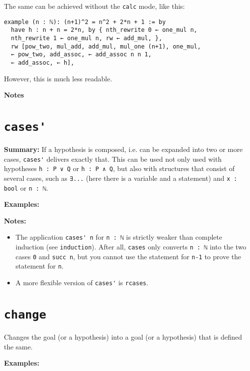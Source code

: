 \documentclass{memoir}
\begin{document}
The same can be achieved without the \Verb|calc| mode, like this:

\begin{verbatim}
example (n : ℕ): (n+1)^2 = n^2 + 2*n + 1 := by
  have h : n + n = 2*n, by { nth_rewrite 0 ← one_mul n,
  nth_rewrite 1 ← one_mul n, rw ← add_mul, },
  rw [pow_two, mul_add, add_mul, mul_one (n+1), one_mul,
  ← pow_two, add_assoc, ← add_assoc n n 1,
  ← add_assoc, ← h],

\end{verbatim}


However, this is much less readable.

\textbf{Notes}




\section{\Verb|cases'|}

\textbf{Summary:} If a hypothesis is composed, i.e. can be expanded into two or more cases, \Verb|cases'| delivers exactly that. This can be used not only used with hypotheses \Verb|h : P ∨ Q| or \Verb|h : P ∧ Q|, but also with structures that consist of several cases, such as \Verb|∃...| (here there is a variable and a statement) and \Verb|x : bool| or \Verb|n : ℕ|.

\textbf{Examples:}

\textbf{Notes:}

\begin{itemize}
\item The application \Verb|cases' n| for \Verb|n : ℕ| is strictly weaker than complete induction (see \Verb|induction|). After all, \Verb|cases| only converts \Verb|n : ℕ| into the two cases \Verb|0| and \Verb|succ n|, but you cannot use the statement for \Verb|n-1| to prove the statement for \Verb|n|.\item A more flexible version of \Verb|cases'| is \Verb|rcases|.

\end{itemize}




\section{\Verb|change|}

Changes the goal (or a hypothesis) into a goal (or a hypothesis) that is defined the same.

\textbf{Examples:}
\end{document}
